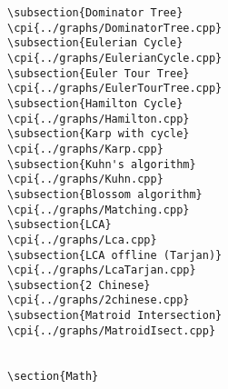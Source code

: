 {\begin{verbatim}
\subsection{Dominator Tree}
\cpi{../graphs/DominatorTree.cpp}
\subsection{Eulerian Cycle}
\cpi{../graphs/EulerianCycle.cpp}
\subsection{Euler Tour Tree}
\cpi{../graphs/EulerTourTree.cpp}
\subsection{Hamilton Cycle}
\cpi{../graphs/Hamilton.cpp}
\subsection{Karp with cycle}
\cpi{../graphs/Karp.cpp}
\subsection{Kuhn's algorithm}
\cpi{../graphs/Kuhn.cpp}
\subsection{Blossom algorithm}
\cpi{../graphs/Matching.cpp}
\subsection{LCA}
\cpi{../graphs/Lca.cpp}
\subsection{LCA offline (Tarjan)}
\cpi{../graphs/LcaTarjan.cpp}
\subsection{2 Chinese}
\cpi{../graphs/2chinese.cpp}
\subsection{Matroid Intersection}
\cpi{../graphs/MatroidIsect.cpp}


\section{Math}


\end{verbatim}}
